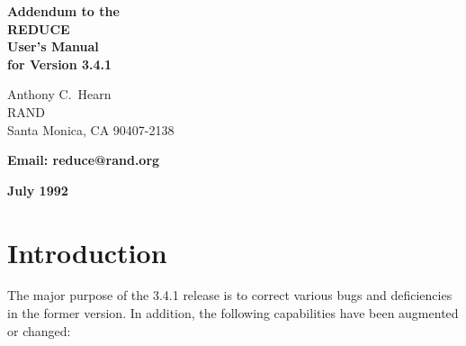 
\parindent 0pt

\parskip 6pt

\raggedbottom

\newlength{\reduceboxwidth}
\setlength{\reduceboxwidth}{4in}

\newlength{\redboxwidth}
\setlength{\redboxwidth}{3.5in}

\newlength{\rboxwidth}
\setlength{\rboxwidth}{2.6in}

\newcommand{\REDUCE}{REDUCE}
\newcommand{\RLISP}{RLISP}
\newcommand{\ttindex}[1]{\index{#1@{\tt #1}}}
\newcommand{\COMPATNOTE}{{\em Compatibility Note:\ }}

\setlength{\topsep}{0.5\baselineskip}  %
\setlength{\itemsep}{\topsep}
\setlength{\abovedisplayskip}{\topsep}  %
\setlength{\belowdisplayskip}{\topsep}

\pagestyle{headings}


\begin{center}

{\LARGE\bf Addendum to the \\[0.4cm]
\Huge\bf {\REDUCE}} \\[0.1cm]
{\LARGE\bf User's Manual\vspace{0.3cm} \\
for Version 3.4.1}

\vspace{0.1in}\large\bf

Anthony C.\ Hearn \\
RAND \\
Santa Monica, CA 90407-2138

\vspace{0.1in}

\bf Email: reduce@rand.org

\vspace{0.1in}

\large\bf July 1992

\vspace*{0.2in}

\end{center}


\section{Introduction}
The major purpose of the 3.4.1 release is to correct various bugs and
deficiencies in the former version.  In addition, the following
capabilities have been augmented or changed:

